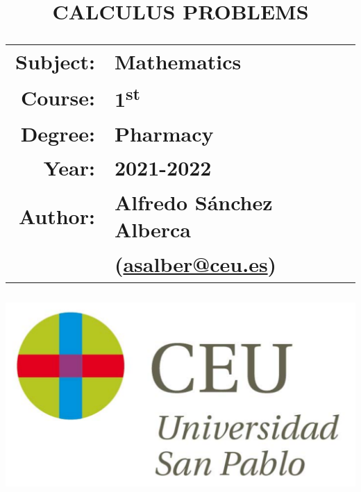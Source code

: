 \documentclass[a4paper,titlepage]{article}
\begin{document}
\sloppy

\title{\vskip 2cm
\Huge \textbf{\textsf{\quad \textcolor{blueceu}{CALCULUS PROBLEMS}\quad}}\\
   \vskip 1cm
\Large \sffamily
\begin{tabular}{rl}
\textcolor{blueceu}{Subject:} & Mathematics\\
\textcolor{blueceu}{Course:} & 1\textsuperscript{st}\\
\textcolor{blueceu}{Degree:} &  Pharmacy\\
\textcolor{blueceu}{Year:} & 2021-2022\\
\textcolor{blueceu}{Author:} & Alfredo S\'anchez Alberca\\  & (\url{asalber@ceu.es})
\end{tabular}
}

\author{}
\date{\includegraphics[scale=0.3]{img/logo_uspceu_01}}

\maketitle
\newpage
\tableofcontents
\newpage











\end{document}
